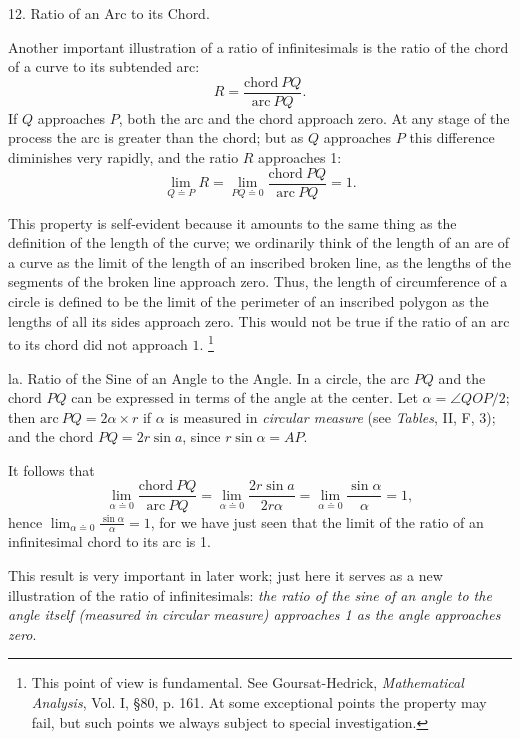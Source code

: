 \documentclass[12pt]{article}
\begin{document}
12. Ratio of an Arc to its Chord.

Another important illustration of a ratio of infinitesimals is 
the ratio of the chord of
a curve to its subtended arc:
$$
R=\frac{\mathrm{chord}\ PQ}{\mathrm{arc}\ PQ}.
$$
If $Q$ approaches $P$, both the arc
and the chord approach zero. At
any stage of the process the arc is
greater than the chord; but as $Q$
approaches $P$ this difference 
diminishes very rapidly, and the
ratio $R$ approaches 1:
$$
\lim_{Q \doteq P}R=
\lim_{PQ \doteq 0}\frac{\mathrm{chord}\ PQ}{\mathrm{arc}\ PQ}=1.
$$

This property is self-evident because it amounts to the same
thing as the definition of the length of the curve; we ordinarily
think of the length of an are of a curve as the limit of the
length of an inscribed broken line, as the lengths of the
segments of the broken line approach zero. Thus, the length
of circumference of a circle is defined to be the limit of the
perimeter of an inscribed polygon
as the lengths of all its sides 
approach zero. This would not be
true if the ratio of an arc to its
chord did not approach $1$.
\footnote{This point of view is fundamental. See Goursat-Hedrick,
{\it Mathematical Analysis}, Vol. I, \S 80, p. 161. At some exceptional
points the property may fail, but such points we always subject to 
special investigation.}

la. Ratio of the Sine of an
Angle to the Angle. In a circle,
the arc $PQ$ and the chord $PQ$ can
be expressed in terms of the angle
at the center. Let $\alpha=\angle QOP/2$;
then $\mathrm{arc}\ PQ=2\alpha\times r$ if $\alpha$ 
is measured in {\it circular measure} (see
{\it Tables}, II, F, 3); and the chord $PQ=2r\sin a$, 
since $r\sin\alpha=AP$.

It follows that
$$
\lim_{\alpha \doteq 0}\frac{\mathrm{chord}\ PQ}{\mathrm{arc}\ PQ}=
\lim_{\alpha \doteq 0}\frac{2r\sin a}{2r\alpha}=
\lim_{\alpha \doteq 0}\frac{\sin\alpha}{\alpha}=1,
$$
hence $\displaystyle \lim_{\alpha \doteq 0}
\frac{\sin \alpha}{\alpha}=1$,
for we have just seen that the limit of the ratio of an infinitesimal 
chord to its arc is 1.

This result is very important in later work; just here it
serves as a new illustration of the ratio of infinitesimals: 
{\it the ratio of the sine of an angle to the angle itself 
(measured in circular measure) approaches 1 as the angle 
approaches zero}.
\end{document}
